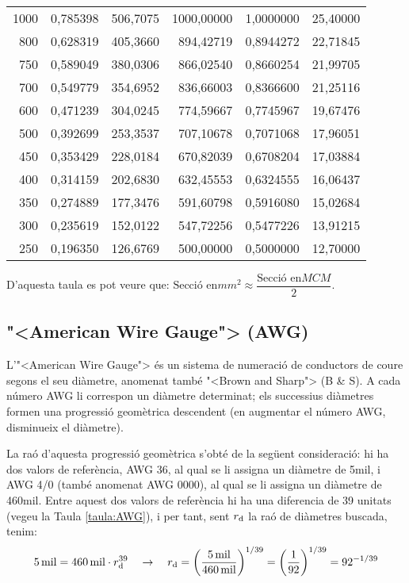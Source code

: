 \begin{longtable}{r<{\hspace{0.6em}}rrrrr}
1000 &   0,785398 &   506,7075 & 1000,00000 &  1,0000000 &   25,40000 \\
 800 &   0,628319 &   405,3660 &  894,42719 &  0,8944272 &   22,71845 \\
 750 &   0,589049 &   380,0306 &  866,02540 &  0,8660254 &   21,99705 \\
 700 &   0,549779 &   354,6952 &  836,66003 &  0,8366600 &   21,25116 \\
 600 &   0,471239 &   304,0245 &  774,59667 &  0,7745967 &   19,67476 \\
 500 &   0,392699 &   253,3537 &  707,10678 &  0,7071068 &   17,96051 \\
 450 &   0,353429 &   228,0184 &  670,82039 &  0,6708204 &   17,03884 \\
 400 &   0,314159 &   202,6830 &  632,45553 &  0,6324555 &   16,06437 \\
 350 &   0,274889 &   177,3476 &  591,60798 &  0,5916080 &   15,02684 \\
 300 &   0,235619 &   152,0122 &  547,72256 &  0,5477226 &   13,91215 \\
 250 &   0,196350 &   126,6769 &  500,00000 &  0,5000000 &   12,70000 \\
\bottomrule[1pt]
\end{longtable}

D'aquesta taula es pot veure que: $\text{Secci\'{o} en}\unit{mm^2} \approx \dfrac{\text{Secci\'{o} en}\unit{MCM}}{2}$.

\subsection{{"<}American Wire Gauge{">} (AWG)}

L'{"<}American Wire Gauge{">} \'{e}s un sistema de numeraci\'{o} de conductors de coure segons el seu di\`{a}metre, anomenat tamb\'{e} {"<}Brown and Sharp{">} (B \& S). A cada n\'{u}mero AWG li correspon un di\`{a}metre determinat; els successius di\`{a}metres formen una progressi\'{o} geom\`{e}trica descendent (en augmentar el n\'{u}mero AWG, disminueix el di\`{a}metre).

La ra\'{o} d'aquesta progressi\'{o} geom\`{e}trica s'obt\'{e} de la seg\"{u}ent consideraci\'{o}: hi ha dos valors de refer\`{e}ncia, AWG 36, al qual se li assigna un di\`{a}metre de 5\unit{mil}, i AWG 4/0 (tamb\'{e} anomenat AWG 0000), al qual se li assigna un di\`{a}metre de 460\unit{mil}. Entre aquest dos valors de refer\`{e}ncia hi ha una diferencia de 39 unitats (vegeu la Taula \vref{taula:AWG}), i per tant, sent $r_\mathrm{d}$ la ra\'{o} de di\`{a}metres buscada, tenim:
\begin{equation}
   5\mathrm{\,mil} = 460\mathrm{\,mil} \cdot r_\mathrm{d}^{39} \quad \rightarrow \quad r_\mathrm{d} = \left( \frac{5\mathrm{\,mil}}{460\mathrm{\,mil}} \right)^{1/39} = \left( \frac{1}{92} \right)^{1/39} = 92^{-1/39}
\end{equation}

